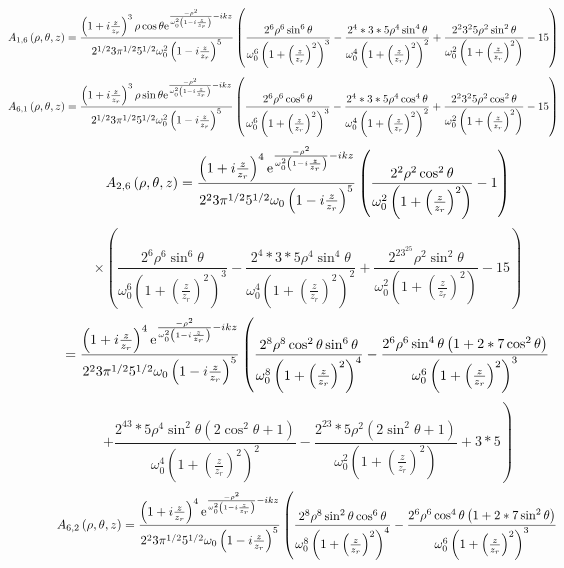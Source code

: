 \documentclass[11pt]{amsart}
\makeatletter
\newcommand{\e}{{\rm e}}				%
\newcommand{\msp}[1]{\mspace{#1mu}}		%
\newcommand{\0}{\varnothing}		%
\newcommand{\1}{!}
\newcommand{\2}{@}
\newcommand{\3}{\#}
\newcommand{\4}{\$}
\newcommand{\5}{\%}
\newcommand{\6}{$^\wedge$}
\newcommand{\7}{\&}
\newcommand{\8}{*}
\newcommand{\9}{(}
\makeatother
\begin{document}
\[
\msp{-80}A_{1,6}\left(\rho,\theta,z\right) = \frac{\left(1+i\frac{z}{z_r}\right)^3\rho\cos\theta\e^{\frac{-\rho^2}{\omega_0^2\left(1-i\frac{z}{z_r}\right)}-ikz}}{2^{1/2}3\pi^{1/2}5^{1/2}\omega_0^2\left(1-i\frac{z}{z_r}\right)^5}\left(\frac{2^6\rho^6\sin^6\theta}{\omega_0^6\left(1+\left(\frac{z}{z_r}\right)^2\right)^3}-\frac{2^4*3*5\rho^4 \sin^4\theta}{\omega_0^4\left(1+\left(\frac{z}{z_r}\right)^2\right)^2}+\frac{2^23^25\rho^2\sin^2\theta}{\omega_0^2\left(1+\left(\frac{z}{z_r}\right)^2\right)}-15\right)
\]
\[
\msp{-80}A_{6,1}\left(\rho,\theta,z\right) = \frac{\left(1+i\frac{z}{z_r}\right)^3\rho\sin\theta\e^{\frac{-\rho^2}{\omega_0^2\left(1-i\frac{z}{z_r}\right)}-ikz}}{2^{1/2}3\pi^{1/2}5^{1/2}\omega_0^2\left(1-i\frac{z}{z_r}\right)^5}\left(\frac{2^6\rho^6\cos^6\theta}{\omega_0^6\left(1+\left(\frac{z}{z_r}\right)^2\right)^3}-\frac{2^4*3*5\rho^4 \cos^4\theta}{\omega_0^4\left(1+\left(\frac{z}{z_r}\right)^2\right)^2}+\frac{2^23^25\rho^2\cos^2\theta}{\omega_0^2\left(1+\left(\frac{z}{z_r}\right)^2\right)}-15\right)
\]
\[
A_{2,6}\left(\rho,\theta,z\right) = \frac{\left(1+i\frac{z}{z_r}\right)^4\e^{\frac{-\rho^2}{\omega_0^2\left(1-i\frac{z}{z_r}\right)}-ikz}}{2^23\pi^{1/2}5^{1/2}\omega_0\left(1-i\frac{z}{z_r}\right)^5}\left(\frac{2^2\rho^2\cos^2\theta}{\omega_0^2\left(1+\left(\frac{z}{z_r}\right)^2\right)}-1\right)
\]
\[
\times\left(\frac{2^6\rho^6\sin^6\theta}{\omega_0^6\left(1+\left(\frac{z}{z_r}\right)^2\right)^3}-\frac{2^4*3*5\rho^4 \sin^4\theta}{\omega_0^4\left(1+\left(\frac{z}{z_r}\right)^2\right)^2}+\frac{2^23^25\rho^2\sin^2\theta}{\omega_0^2\left(1+\left(\frac{z}{z_r}\right)^2\right)}-15\right)
\]
\[
=\frac{\left(1+i\frac{z}{z_r}\right)^4\e^{\frac{-\rho^2}{\omega_0^2\left(1-i\frac{z}{z_r}\right)}-ikz}}{2^23\pi^{1/2}5^{1/2}\omega_0\left(1-i\frac{z}{z_r}\right)^5}\left(\frac{2^8\rho^8\cos^2\theta\sin^6\theta}{\omega_0^8\left(1+\left(\frac{z}{z_r}\right)^2\right)^4}-\frac{2^6\rho^6\sin^4\theta\left(1+2*7\cos^2\theta\right)}{\omega_0^6\left(1+\left(\frac{z}{z_r}\right)^2\right)^3}\right.
\]
\[\left.+\frac{2^43*5\rho^4\sin^2\theta\left(2\cos^2\theta+1\right)}{\omega_0^4\left(1+\left(\frac{z}{z_r}\right)^2\right)^2}-\frac{2^23*5\rho^2\left(2\sin^2\theta+1\right)}{\omega_0^2\left(1+\left(\frac{z}{z_r}\right)^2\right)}+3*5\right)
\]
\[
A_{6,2}\left(\rho,\theta,z\right) = \frac{\left(1+i\frac{z}{z_r}\right)^4\e^{\frac{-\rho^2}{\omega_0^2\left(1-i\frac{z}{z_r}\right)}-ikz}}{2^23\pi^{1/2}5^{1/2}\omega_0\left(1-i\frac{z}{z_r}\right)^5}\left(\frac{2^8\rho^8\sin^2\theta\cos^6\theta}{\omega_0^8\left(1+\left(\frac{z}{z_r}\right)^2\right)^4}-\frac{2^6\rho^6\cos^4\theta\left(1+2*7\sin^2\theta\right)}{\omega_0^6\left(1+\left(\frac{z}{z_r}\right)^2\right)^3}\right.
\]
\end{document}
